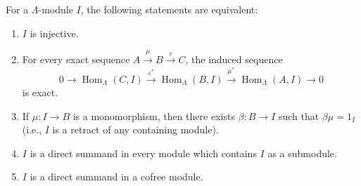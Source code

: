 For a $\Lambda$-module $I$, the following statements are equivalent:
\begin{enumerate}
\item[(1)] $I$ is injective.
\item[(2)] For every exact sequence $A \xrightarrow{\mu} B \xrightarrow{\varepsilon} C$, the induced sequence
$$0 \to \operatorname{Hom}_\Lambda(C, I) \xrightarrow{\varepsilon^*} \operatorname{Hom}_\Lambda(B, I) \xrightarrow{\mu^*} \operatorname{Hom}_\Lambda(A, I) \to 0$$
is exact.
\item[(3)] If $\mu : I \to B$ is a monomorphism, then there exists $\beta : B \to I$ such that $\beta\mu = 1_I$ (i.e., $I$ is a retract of any containing module).
\item[(4)] $I$ is a direct summand in every module which contains $I$ as a submodule.
\item[(5)] $I$ is a direct summand in a cofree module.
\end{enumerate}